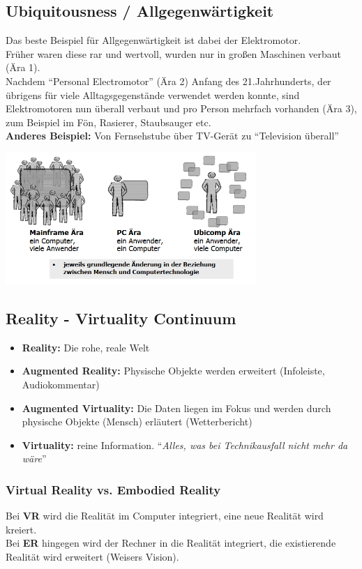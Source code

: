 \documentclass[a4paper]{article}
\begin{document}
\subsection{Ubiquitousness / Allgegenwärtigkeit}
Das beste Beispiel für Allgegenwärtigkeit ist dabei der Elektromotor.\\
 Früher waren diese rar und wertvoll, wurden nur in großen Maschinen verbaut (Ära 1).\\
 Nachdem ``Personal Electromotor'' (Ära 2) Anfang des 21.Jahrhunderts, der übrigens für viele Alltagsgegenstände verwendet werden konnte, sind Elektromotoren nun überall verbaut und pro Person mehrfach vorhanden (Ära 3), zum Beispiel im Fön, Rasierer, Staubsauger etc.\\
 \textbf{Anderes Beispiel:} Von Fernsehstube über TV-Gerät zu ``Television überall''
 \begin{center}
 	\includegraphics[height = 5cm]{Trend.png}
 \end{center}
 \subsection{Reality - Virtuality Continuum}
 \begin{itemize}
 	\item \textbf{Reality:} Die rohe, reale Welt
 	\item \textbf{Augmented Reality:} Physische Objekte werden erweitert (Infoleiste, Audiokommentar)
 	\item \textbf{Augmented Virtuality:} Die Daten liegen im Fokus und werden durch physische Objekte (Mensch) erläutert (Wetterbericht) 
 	\item \textbf{Virtuality:} reine Information. ``\textit{Alles, was bei Technikausfall nicht mehr da wäre}''
 \end{itemize}
\subsubsection{Virtual Reality vs. Embodied Reality}
Bei \textbf{VR} wird die Realität im Computer integriert, eine neue Realität wird kreiert. \\
Bei \textbf{ER} hingegen wird der Rechner in die Realität integriert, die existierende Realität wird erweitert (Weisers Vision).
\end{document}
